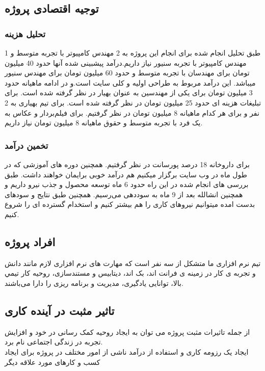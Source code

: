 \documentclass[a4paper]{article}
\begin{document}
		\subsection{توجیه اقتصادی پروژه}
		\subsubsection{تحلیل هزینه}
		طبق تحلیل انجام شده برای انجام این پروژه به 2 مهندس کامپیوتر با تجربه متوسط و 1 مهندس کامپیوتر با تجربه سنیور نیاز داریم.درآمد پیشبینی شده آنها حدود 40 میلیون تومان برای مهندسان با تجربه متوسط و حدود 60 میلیون تومان برای مهندس سنیور میباشد. این درآمد مربوط به طراحی اولیه و کلی سایت است.و در ادامه ماهیانه حدود 3 میلیون تومان برای یکی از مهندسین به عنوان بهیار در نظر گرفته شده است.
		برای تبلیغات هزینه ای حدود 25 میلیون تومان در نظر گرفته شده است.
		برای تیم بهیاری به 2 نفر و برای هر کدام ماهیانه 8 میلیون تومان در نظر گرفتیم.
		برای فیلم‌بردار و عکاس به یک فرد با تجربه متوسط و حقوق ماهیانه 8 میلیون تومان نیاز داریم.
		
		\subsubsection{تخمین درآمد}
		برای داروخانه 18 درصد پورسانت در نظر گرفتیم.
		همچنین دوره های آموزشی که در طول ماه در وب سایت برگزار میکنیم هم درآمد خوبی برایمان خواهند داشت.
		طبق بررسی های انجام شده در این راه حدود 6 ماه توسعه محصول و جذب نیرو داریم و همچنین انشالله بعد از 9 ماه به سوددهی می‌رسیم. همچنین طبق نتایج و سودهای بدست امده میتوانیم نیروهای کاری را هم بیشتر کنیم و استخدام گسترده ای را شروع کنیم.
				
		\subsection{افراد پروژه}
		تیم نرم افزاری ما متشکل از سه نفر است که مهارت های نرم افزاری لازم مانند دانش و تجربه ی کار در زمینه ی فرانت اند، بک اند، دیتابیس و مستندسازی، روحیه كار تيمي بالا، توانایی یادگیری، مديريت و برنامه ريزى را دارا مى‌باشند.
		
		\subsection{تاثیر مثبت در آینده کاری}
		از جمله تاثیرات مثبت پروژه می توان به ایجاد روحیه کمک رسانی در خود و افزایش تجربه در زندگی اجتماعی نام برد.
\\	ایجاد یک رزومه کاری و استفاده از درآمد ناشی از امور مختلف در پروژه برای ایجاد کسب و کارهای مورد علاقه دیگر
		
\end{document}
